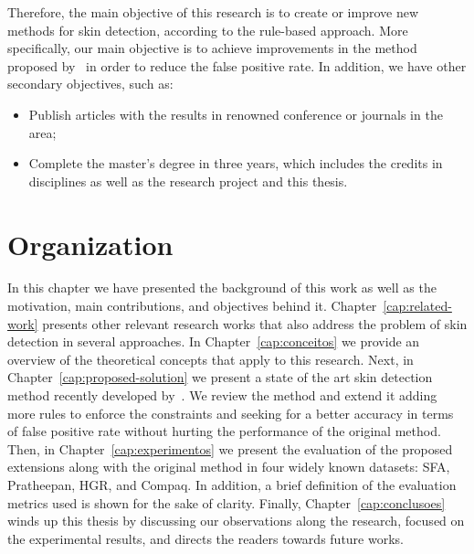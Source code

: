Therefore, the main objective of this research is to create or improve new methods for skin detection, according to the rule-based approach. More specifically, our main objective is to achieve improvements in the method proposed by~\citet{brancati:17} in order to reduce the false positive rate. In addition, we have other secondary objectives, such as:
\begin{itemize}
    \item Publish articles with the results in renowned conference or journals in the area;
    \item Complete the master's degree in three years, which includes the credits in disciplines as well as the research project and this thesis.
\end{itemize}



\section{Organization}
\label{sec:text_organization}
In this chapter we have presented the background of this work as well as the motivation, main contributions, and objectives behind it. Chapter~\ref{cap:related-work} presents other relevant research works that also address the problem of skin detection in several approaches. In Chapter~\ref{cap:conceitos} we provide an overview of the theoretical concepts that apply to this research. Next, in Chapter~\ref{cap:proposed-solution} we present a state of the art skin detection method recently developed by~\citet{brancati:17}. We review the method and extend it adding more rules to enforce the constraints and seeking for a better accuracy in terms of false positive rate without hurting the performance of the original method. Then, in Chapter~\ref{cap:experimentos} we present the evaluation of the proposed extensions along with the original method in four widely known datasets: SFA, Pratheepan, HGR, and Compaq. In addition, a
brief definition of the evaluation metrics used is shown for the sake of clarity. Finally, Chapter~\ref{cap:conclusoes} winds up this thesis by discussing our observations along the research, focused on the experimental results, and directs the readers towards future works.